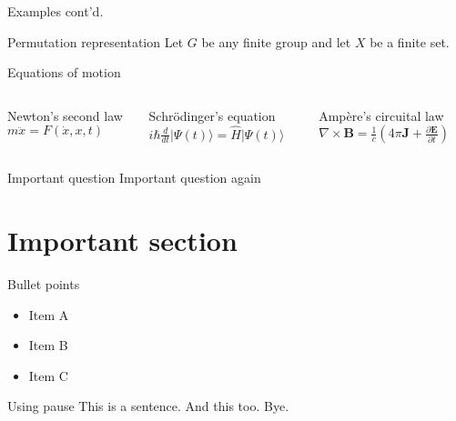 \documentclass[handout, 10pt]{beamer}
\begin{document}
	\begin{frame}{Examples cont'd.}
		\begin{exampleblock}{Permutation representation}
			Let $G$ be any finite group and let $X$ be a finite set.
		\end{exampleblock}
	\end{frame}
	
	
	
	
	\begin{frame}{Equations of motion} 
		
		\begin{columns}
			\begin{block}{Newton's second law}
				$m\ddot{x} = F(\dot{x}, x, t)$
			\end{block}
			\begin{block}{Schrödinger's equation}
				${\displaystyle i\hbar {\frac {d}{dt}}\vert \Psi (t)\rangle ={\hat {H}}\vert \Psi (t)\rangle }$
			\end{block}
			\begin{block}{Ampère's circuital law}
				$ \nabla \times \mathbf{B}=\frac{1}{c}\left(4 \pi \mathbf{J}+\frac{\partial \mathbf{E}}{\partial t}\right)$
			\end{block}
		\end{columns}
	\end{frame}
	\begin{frame}{Important question}
		Important question again
	\end{frame}
	\section{Important section}
	\begin{frame}{Bullet points}
		\begin{itemize}
			\item Item A
			\item Item B
			\item Item C
		\end{itemize}
	\end{frame}
	\begin{frame}{Using pause}
		This is a sentence. \pause 
		And this too. \pause
		\alert{Bye}. 
	\end{frame}
	
\end{document}
